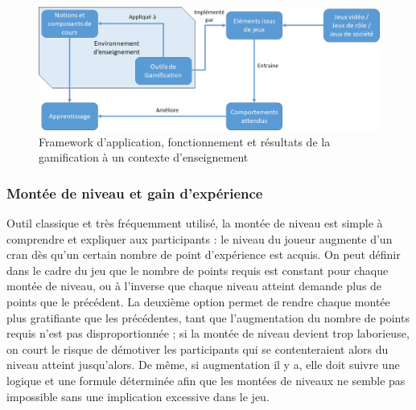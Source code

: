 \begin{figure}
    \centering
    \includegraphics[width=\linewidth]{Images/Framework_Gamification_Education.png}
    \caption{Framework d'application, fonctionnement et résultats de la gamification à un contexte d'enseignement}
    \label{fig:framework_gamif}
\end{figure}

\subsubsection{Montée de niveau et gain d'expérience}
Outil classique et très fréquemment utilisé, la montée de niveau est simple à comprendre et expliquer aux participants : le niveau du joueur augmente d'un cran dès qu'un certain nombre de point d'expérience est acquis. On peut définir dans le cadre du jeu que le nombre de points requis est constant pour chaque montée de niveau, ou à l'inverse que chaque niveau atteint demande plus de points que le précédent. La deuxième option permet de rendre chaque montée plus gratifiante que les précédentes, tant que l'augmentation du nombre de points requis n'est pas disproportionnée ; si la montée de niveau devient trop laborieuse, on court le risque de démotiver les participants qui se contenteraient alors du niveau atteint jusqu'alors. De même, si augmentation il y a, elle doit suivre une logique et une formule déterminée afin que les montées de niveaux ne semble pas impossible sans une implication excessive dans le jeu. \par

